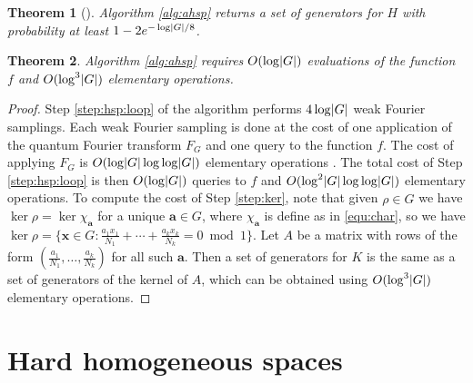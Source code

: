 \documentclass[11pt]{article}
\theoremstyle{plain}
\newtheorem{theorem}{Theorem}[section]
\theoremstyle{definition}
\DeclarePairedDelimiter{\abs}{\lvert}{\rvert}
\begin{document}
\begin{theorem}[{\cite[Theorem 4.3]{hallgren2003hidden}}]
	Algorithm \ref{alg:ahsp} returns a set of generators for $H$ with probability at least $1 - 
	2e^{-\log \abs{G} / 8}$.
\end{theorem}

\begin{theorem}
	\label{thm:ahsp-time}
	Algorithm \ref{alg:ahsp} requires $O(\log \abs{G})$ evaluations of the function $f$ and 
	$O(\log^3 \abs{G})$ elementary operations.
\end{theorem}
\begin{proof}
	Step \ref{step:hsp:loop} of the algorithm performs $4\log \abs{G}$ weak Fourier samplings. Each 
	weak Fourier sampling is done at the cost of one application of the quantum Fourier transform 
	$F_G$ and one query to the function $f$. The cost of applying $F_G$ is $O(\log \abs{G} \log\log 
	\abs{G})$ elementary operations \cite{cleve1998quantum}. The total cost of Step 
	\ref{step:hsp:loop} is then $O(\log \abs{G})$ queries to $f$ and $O(\log^2 \abs{G} \log\log 
	\abs{G})$ elementary operations. To compute the cost of Step \ref{step:ker}, note that given 
	$\rho \in \hat{G}$ we have $\ker \rho = \ker \chi_{\bm{a}}$ for a unique $\bm{a} \in G$, where  
	$\chi_{\bm{a}}$ is define as in \eqref{equ:char}, so we have $\ker \rho = \{ \bm{x} \in G: 
	\frac{a_1x_1}{N_1} + \cdots + \frac{a_kx_k}{N_k} = 0 \bmod 1 \}$. Let $A$ be a matrix with rows 
	of the form $(\frac{a_1}{N_1}, \dots, \frac{a_k}{N_k})$ for all such $\bm{a}$. Then a set of 
	generators for $K$ is the same as a set of generators of the kernel of $A$, which can be 
	obtained using $O(\log^3 \abs{G})$ elementary operations.
\end{proof}




\section{Hard homogeneous spaces}
\label{sec:hhs}
\end{document}

